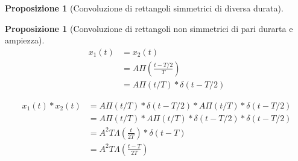 \documentclass[a4paper,10pt]{article}
\theoremstyle{mystyle}
\newtheorem{proposition}[theorem]{Proposizione}
\begin{document}
\begin{multicols}{2}
\begin{proposition}[Convoluzione di rettangoli simmetrici di diversa durata]
\begin{center}
    \end{center}
    
\end{proposition}

\begin{proposition}[Convoluzione di rettangoli non simmetrici di pari durarta e ampiezza]
    \begin{align*}
        x_1(t)
        &= x_2(t) \\
        &=A \Pi \left ( \frac{t- T/2}{T} \right) \\
        &= A \Pi (t/T) * \delta ( t - T/2 )
    \end{align*}

    \begin{align*}
        x_1 (t) * x_2(t)
        &= A \Pi (t/T) * \delta ( t - T/2) * A \Pi (t/T) * \delta (t - T/2) \\
        &= A \Pi (t/T) * A \Pi (t/T)* \delta (t-T/2)*\delta(t-T/2) \\
        &= A^2 T \Lambda \left(\frac{t}{2T}\right) * \delta (t-T) \\
        &= A^2 T \Lambda \left(\frac{t-T}{2T}\right)
    \end{align*}

    \begin{center}
    \end{center}
\end{proposition}


\end{multicols}
\end{document}
